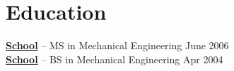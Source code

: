 \documentclass[11pt]{article}       %
\begin{document}

\vspace{-18.5pt}

\section*{Education}
\textbf{\href{https://www.southharmoninstituteoftechnology.org/}{School}} -- MS in Mechanical Engineering \hfill June 2006 \\
\textbf{\href{https://www.southharmoninstituteoftechnology.org/}{School}} -- BS in Mechanical Engineering \hfill Apr 2004
\end{document}
